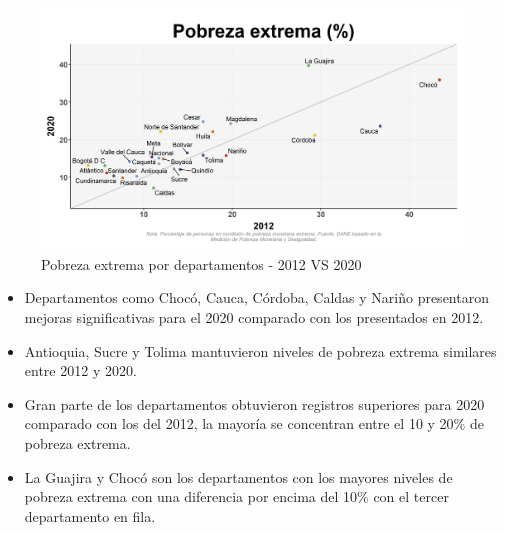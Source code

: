     \begin{figure}[H]
        \caption{Pobreza extrema por departamentos - 2012 VS 2020 \label{map_result_2} }
        \begin{center}
        \includegraphics[width=\textwidth,keepaspectratio]{img/var_258_scatter_time.png}
        \end{center}
    \end{figure}
            \begin{itemize}
                    \item Departamentos como Chocó, Cauca, Córdoba, Caldas y Nariño presentaron mejoras significativas para el 2020 comparado con los presentados en 2012.
                    \item Antioquia, Sucre y Tolima mantuvieron niveles de pobreza extrema similares entre 2012 y 2020.
                    \item Gran parte de los departamentos obtuvieron registros superiores para 2020 comparado con los del 2012, la mayoría se concentran entre el 10 y 20\% de pobreza extrema.
                    \item La Guajira y Chocó son los departamentos con los mayores niveles de pobreza extrema con una diferencia por encima del 10\% con el tercer departamento en fila.
                    \end{itemize}

